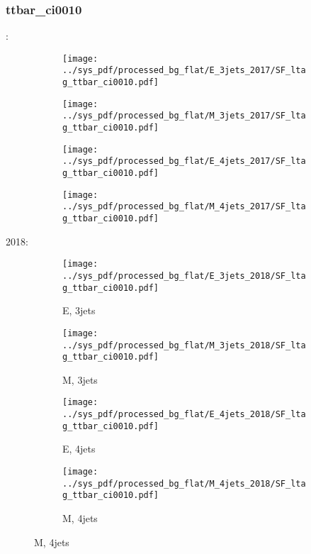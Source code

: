 \documentclass{beamer}
\begin{document}
\begin{frame}
\frametitle{ttbar_ci0010}
\fontsize{5}{1}:
\begin{figure}
\centering
\begin{subfigure}[b]{0.24\textwidth}
\texttt{[image: ../sys\_pdf/processed\_bg\_flat/E\_3jets\_2017/SF\_ltag\_ttbar\_ci0010.pdf]}
\end{subfigure}
\begin{subfigure}[b]{0.24\textwidth}
\texttt{[image: ../sys\_pdf/processed\_bg\_flat/M\_3jets\_2017/SF\_ltag\_ttbar\_ci0010.pdf]}
\end{subfigure}
\begin{subfigure}[b]{0.24\textwidth}
\texttt{[image: ../sys\_pdf/processed\_bg\_flat/E\_4jets\_2017/SF\_ltag\_ttbar\_ci0010.pdf]}
\end{subfigure}
\begin{subfigure}[b]{0.24\textwidth}
\texttt{[image: ../sys\_pdf/processed\_bg\_flat/M\_4jets\_2017/SF\_ltag\_ttbar\_ci0010.pdf]}
\end{subfigure}
\end{figure}
2018:
\begin{figure}
\centering
\begin{subfigure}[b]{0.24\textwidth}
\texttt{[image: ../sys\_pdf/processed\_bg\_flat/E\_3jets\_2018/SF\_ltag\_ttbar\_ci0010.pdf]}
\captionsetup{font=tiny}
\caption{E, 3jets}
\end{subfigure}
\begin{subfigure}[b]{0.24\textwidth}
\texttt{[image: ../sys\_pdf/processed\_bg\_flat/M\_3jets\_2018/SF\_ltag\_ttbar\_ci0010.pdf]}
\captionsetup{font=tiny}
\caption{M, 3jets}
\end{subfigure}
\begin{subfigure}[b]{0.24\textwidth}
\texttt{[image: ../sys\_pdf/processed\_bg\_flat/E\_4jets\_2018/SF\_ltag\_ttbar\_ci0010.pdf]}
\captionsetup{font=tiny}
\caption{E, 4jets}
\end{subfigure}
\begin{subfigure}[b]{0.24\textwidth}
\texttt{[image: ../sys\_pdf/processed\_bg\_flat/M\_4jets\_2018/SF\_ltag\_ttbar\_ci0010.pdf]}
\captionsetup{font=tiny}
\caption{M, 4jets}
\end{subfigure}
\end{figure}
\end{frame}
\end{document}
